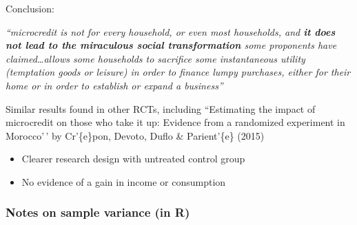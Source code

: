 \documentclass[
  letterpaper,
  DIV=11,
  numbers=noendperiod]{scrreprt}
\newenvironment{Shaded}{\begin{snugshade}}{\end{snugshade}}
\newcommand{\AttributeTok}[1]{\textcolor[rgb]{0.40,0.45,0.13}{#1}}
\newcommand{\ConstantTok}[1]{\textcolor[rgb]{0.56,0.35,0.01}{#1}}
\newcommand{\DecValTok}[1]{\textcolor[rgb]{0.68,0.00,0.00}{#1}}
\newcommand{\FunctionTok}[1]{\textcolor[rgb]{0.28,0.35,0.67}{#1}}
\newcommand{\NormalTok}[1]{\textcolor[rgb]{0.00,0.23,0.31}{#1}}
\newcommand{\OtherTok}[1]{\textcolor[rgb]{0.00,0.23,0.31}{#1}}
\newcommand{\SpecialCharTok}[1]{\textcolor[rgb]{0.37,0.37,0.37}{#1}}
\newcommand{\StringTok}[1]{\textcolor[rgb]{0.13,0.47,0.30}{#1}}
\providecommand{\tightlist}{%
  \setlength{\itemsep}{0pt}\setlength{\parskip}{0pt}}\usepackage{longtable,booktabs,array}
\theoremstyle{definition}
\theoremstyle{remark}
\begin{document}
Conclusion:

\emph{``microcredit is not for every household, or even most households,
and \textbf{it does not lead to the miraculous social transformation}
some proponents have claimed\ldots allows some households to sacrifice
some instantaneous utility (temptation goods or leisure) in order to
finance lumpy purchases, either for their home or in order to establish
or expand a business''}

Similar results found in other RCTs, including ``Estimating the impact
of microcredit on those who take it up: Evidence from a randomized
experiment in Morocco'\,' by Cr'\{e\}pon, Devoto, Duflo \& Parient'\{e\}
(2015)

\par

\begin{itemize}
\tightlist
\item
  Clearer research design with untreated control group
\item
  No evidence of a gain in income or consumption
\end{itemize}

\subsubsection{Notes on sample variance (in
R)}\label{notes-on-sample-variance-in-r}

\begin{Shaded}
\end{Shaded}
\end{document}
